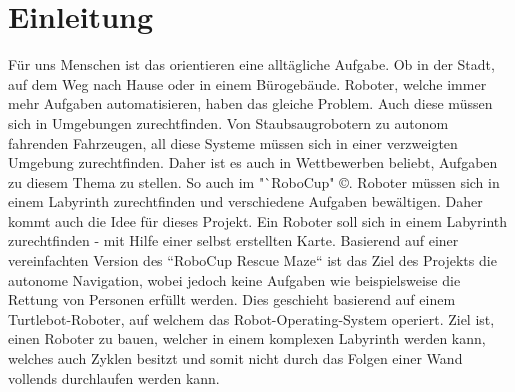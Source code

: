 \section{Einleitung}
{
	Für uns Menschen ist das orientieren eine alltägliche Aufgabe. Ob in der Stadt, auf dem Weg nach Hause oder in einem Bürogebäude. Roboter, welche immer mehr Aufgaben automatisieren, haben das gleiche Problem. Auch diese müssen sich in Umgebungen zurechtfinden. Von Staubsaugrobotern zu autonom fahrenden Fahrzeugen, all diese Systeme müssen sich in einer verzweigten Umgebung zurechtfinden. Daher ist es auch in Wettbewerben beliebt, Aufgaben zu diesem Thema zu stellen. So auch im "`RoboCup" \copyright. Roboter müssen sich in einem Labyrinth zurechtfinden und verschiedene Aufgaben bewältigen. Daher kommt auch die Id\texttt{}ee für dieses Projekt. Ein Roboter soll sich in einem Labyrinth zurechtfinden - mit Hilfe einer selbst erstellten Karte. Basierend auf einer vereinfachten Version des ``RoboCup Rescue Maze`` ist das Ziel des Projekts die autonome Navigation, wobei jedoch keine Aufgaben wie beispielsweise die Rettung von Personen erfüllt werden. Dies geschieht basierend auf einem Turtlebot-Roboter, auf welchem das Robot-Operating-System operiert. Ziel ist, einen Roboter zu bauen, welcher in einem komplexen Labyrinth werden kann, welches auch Zyklen besitzt und somit nicht durch das Folgen einer Wand vollends durchlaufen werden kann.
}